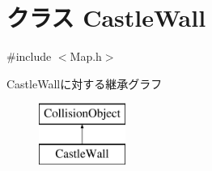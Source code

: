 \hypertarget{class_castle_wall}{\section{クラス Castle\-Wall}
\label{class_castle_wall}
}


{\ttfamily \#include $<$Map.\-h$>$}

Castle\-Wallに対する継承グラフ\begin{figure}[H]
\begin{center}
\leavevmode
\includegraphics[height=2.000000cm]{d5/d6f/class_castle_wall}
\end{center}
\end{figure}
